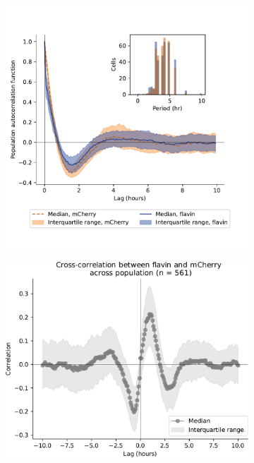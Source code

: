\begin{figure}[p]
\begin{subfigure}[htpb]{1.0\textwidth}
  \end{subfigure}
  \begin{subfigure}[t]{0.45\textwidth}
   \centering
   \includegraphics[width=\textwidth]{htb2mCherry_31594_12.pdf}
   \caption{
   }
   \label{fig:biology-pyruvate-acf}
  \end{subfigure}%
  \begin{subfigure}[t]{0.45\textwidth}
   \centering
   \includegraphics[width=\textwidth]{pyruvate_xcf_edit.pdf}
   \caption{
   }
   \label{fig:biology-pyruvate-xcf}
  \end{subfigure}


\end{figure}
